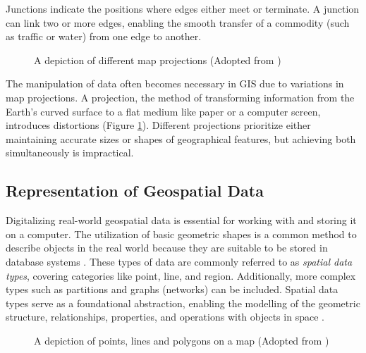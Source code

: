 Junctions indicate the positions where edges either meet or terminate. A junction can link two or more edges, enabling the smooth transfer of a commodity (such as traffic or water) from one edge to another.

\begin{figure}[ht]
	\centering
	
	\caption{A depiction of different map projections (Adopted from \cite{battersby2017})}
	\label{fig:gis-map-projections}
\end{figure}

The manipulation of data often becomes necessary in GIS due to variations in map projections. A projection, the method of transforming information from the Earth's curved surface to a flat medium like paper or a computer screen, introduces distortions (Figure \ref{fig:gis-map-projections}). Different projections prioritize either maintaining accurate sizes or shapes of geographical features, but achieving both simultaneously is impractical.


\newpage

\subsection{Representation of Geospatial Data}

Digitalizing real-world geospatial data is essential for working with and storing it on a computer. The utilization of basic geometric shapes is a common method to describe objects in the real world because they are suitable to be stored in database systems \cite{schneider1999spatial}. These types of data are commonly referred to as \textit{spatial data types}, covering categories like point, line, and region. Additionally, more complex types such as partitions and graphs (networks) can be included. Spatial data types serve as a foundational abstraction, enabling the modelling of the geometric structure, relationships, properties, and operations with objects in space \cite{schneider1999spatial}.

\begin{figure}[ht]
    \centering
    
    \caption{A depiction of points, lines and polygons on a map (Adopted from \cite{sumer2016promoting})}
    \label{fig:gis-data-types}
\end{figure}

